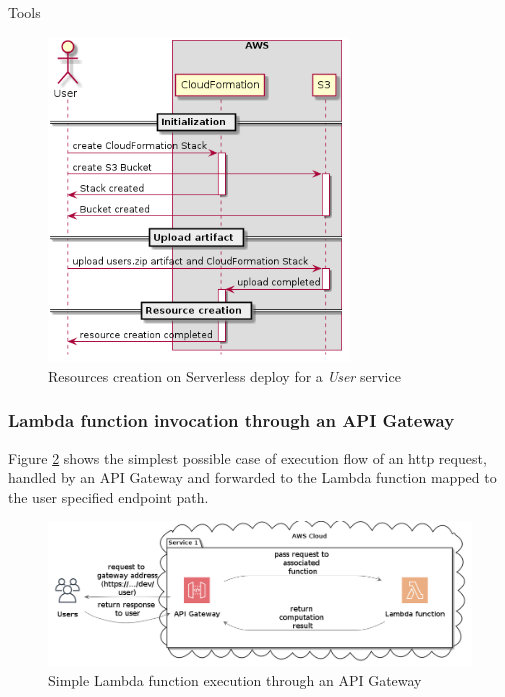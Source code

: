 \begin{chapter}{Tools}
    \begin{figure}
        \centering
        \includegraphics[width=8cm]{source/diagrams/sls_deploy_on_aws.png}
        \caption{Resources creation on Serverless deploy for a \textit{User} service}
        \label{fig:sls_deploy_on_aws}
    \end{figure}

    \subsubsection{Lambda function invocation through an API Gateway}
    \label{subsec:lambda_invocation}

    Figure \ref{fig:simple_lambda} shows the simplest possible case of execution
    flow of an http request, handled by an API Gateway and forwarded to the Lambda
    function mapped to the user specified endpoint path.

    \begin{figure}
        \centering
        \includegraphics[width=\linewidth]{source/diagrams/lambda_invocation.png}
        \caption{Simple Lambda function execution through an API Gateway}
        \label{fig:simple_lambda}
    \end{figure}


\end{chapter}
